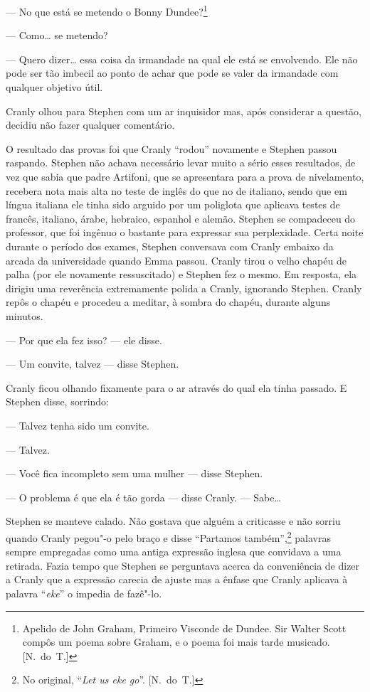 --- No que está se metendo o Bonny Dundee?\footnote{ Apelido de John Graham,
Primeiro Visconde de Dundee.  Sir Walter Scott compôs um poema sobre Graham, e
o poema foi mais tarde musicado. [N.~do~T.]} 

--- Como\ldots{} se metendo?

--- Quero dizer\ldots{} essa coisa da irmandade na qual ele está se
envolvendo.  Ele não pode ser tão imbecil ao ponto de achar que pode se
valer da irmandade com qualquer objetivo útil.

Cranly olhou para Stephen com um ar inquisidor mas, após considerar
a questão, decidiu não fazer qualquer comentário.

O resultado das provas foi que Cranly “rodou” novamente e Stephen
passou raspando.  Stephen não achava necessário levar muito a sério
esses resultados, de vez que sabia que padre Artifoni, que se
apresentara para a prova de nivelamento, recebera nota mais alta no
teste de inglês do que no de italiano, sendo que em língua italiana ele
tinha sido arguido por um poliglota que aplicava testes de francês,
italiano, árabe, hebraico, espanhol e alemão.  Stephen se compadeceu do
professor, que foi ingênuo o bastante para expressar sua perplexidade. 
Certa noite durante o período dos exames, Stephen conversava com Cranly
embaixo da arcada da universidade quando Emma passou.  Cranly tirou o
velho chapéu de palha (por ele novamente ressuscitado) e Stephen fez o
mesmo.  Em resposta, ela dirigiu uma reverência extremamente polida a
Cranly, ignorando Stephen.  Cranly repôs o chapéu e procedeu a meditar,
à sombra do chapéu, durante alguns minutos.

--- Por que ela fez isso? --- ele disse.

--- Um convite, talvez --- disse Stephen.

Cranly ficou olhando fixamente para o ar através do qual ela tinha
passado.  E Stephen disse, sorrindo:

--- Talvez tenha sido um convite.

--- Talvez.

--- Você fica incompleto sem uma mulher --- disse Stephen.

--- O problema é que ela é tão gorda --- disse Cranly.  --- Sabe\ldots{}

Stephen se manteve calado.  Não gostava que alguém a criticasse e
não sorriu quando Cranly pegou"-o pelo braço e disse “Partamos
também”,\footnote[\setcounter{symbol}{1}]{ No original, “\textit{Let us eke go}”. [N.~do~T.]}
palavras sempre empregadas como uma \label{antiga"-expressao} antiga expressão
inglesa que convidava a uma retirada.  Fazia tempo que Stephen se
perguntava acerca da conveniência de dizer a Cranly que a expressão
carecia de ajuste mas a ênfase que Cranly aplicava à palavra
“\textit{eke}” o impedia de fazê"-lo.

